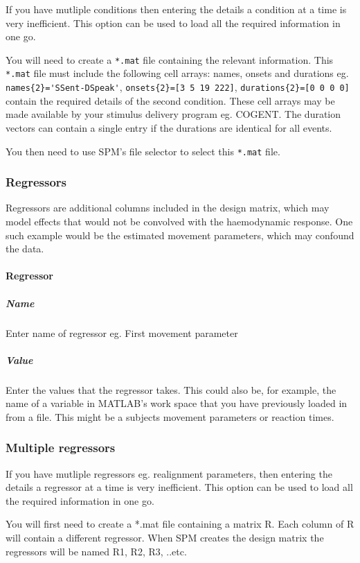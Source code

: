 \documentclass[a4paper,titlepage]{book}
\begin{document}
If you have mutliple conditions then entering the details a condition 
at a time is very inefficient. This option can be used to load all the 
required information in one go. 

You will need to create a \verb!*.mat! file 
containing the relevant information. 
This \verb!*.mat! file must include the following cell arrays: names, onsets and durations 
eg. \verb!names{2}='SSent-DSpeak'!, 
\verb!onsets{2}=[3 5 19 222]!, \verb!durations{2}=[0 0 0 0]! contain the required details of the second condition. These cell arrays may be made available 
by your stimulus delivery program eg. COGENT. The duration vectors can 
contain a single entry if the durations are identical for all events. 

You then need to use SPM's file selector to select this
\verb!*.mat! file.

\subsubsection{Regressors}
Regressors are additional columns included in the design matrix, which may model effects that would not be convolved with the haemodynamic response.  One such example would be the estimated movement parameters, which may confound the data.


\paragraph{Regressor}


\subparagraph{Name}
Enter name of regressor eg. First movement parameter


\subparagraph{Value}
Enter the values that the regressor takes. This could also be, for example, the name of a variable in MATLAB's work space that you 
have previously loaded in from a file. This might be a subjects
movement parameters or reaction times.

\subsubsection{Multiple regressors}

If you have mutliple regressors eg. realignment parameters, then entering the details a regressor at a time is very inefficient. 
This option can be used to load all the 
required information in one go. 

You will first need to create a *.mat file 
containing a matrix R. Each column of R will contain a different regressor. When SPM creates the design matrix the regressors will be named R1, R2, R3, ..etc.
\end{document}
